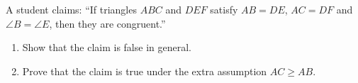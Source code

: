 A student claims: ``If triangles $ABC$ and $DEF$ satisfy $AB=DE$, $AC=DF$ and $\angle B=\angle E$, then they are congruent.''
\begin{enumerate}
\item[(a)] Show that the claim is false in general.
\item[(b)] Prove that the claim is true under the extra assumption $AC\ge AB$.
\end{enumerate}
